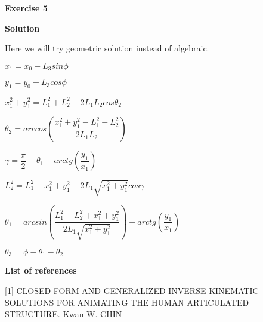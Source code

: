 \documentclass[12pt]{article}
\begin{document}
\newpage

\textbf{Exercise 5}	
\newpage	
		
\textbf{Solution}

Here we will try geometric solution instead of algebraic.

$x_1 = x_0 - L_3 sin \phi$

$y_1 = y_0 - L_3 cos \phi$

$x_1^2 + y_1^2 = L_1^2 + L_2^2 - 2 L_1 L_2 cos \theta_2$

$\theta_2 = arccos \left( \dfrac{x_1^2 + y_1^2 - L_1^2 - L_2^2}{2 L_1 L_2} \right)$

$\gamma = \dfrac{\pi}{2} - \theta_1 - arctg(\dfrac{y_1}{x_1})$

$L_2^2 = L_1^2 + x_1^2 + y_1^2 - 2L_1 \sqrt{x_1^2 + y_1^2} cos \gamma$

$\theta_1 = arcsin \left( \dfrac{L_1^2 - L_2^2 + x_1^2 + y_1^2}{2L_1 \sqrt{x_1^2 + y_1^2}} \right) - arctg \left( \dfrac{y_1}{x_1} \right)$

$\theta_3 = \phi - \theta_1 - \theta_2$

\bigskip

\textbf{List of references}

[1] CLOSED FORM AND GENERALIZED INVERSE KINEMATIC SOLUTIONS FOR ANIMATING THE HUMAN ARTICULATED STRUCTURE. Kwan W. CHIN
\end{document}
